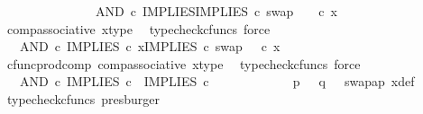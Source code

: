 \begin{isabellebody}
\ \ \ \ \ \ \ \ \ \ \ \ \ \ \ AND\ {\isasymcirc}\isactrlsub c\ {\isasymlangle}IMPLIES{\isacharcomma}{\kern0pt}IMPLIES\ {\isasymcirc}\isactrlsub c\ swap\ {\isasymOmega}\ {\isasymOmega}{\isasymrangle}\ \ {\isasymcirc}\isactrlsub c\ x{\isachardoublequoteclose}\isanewline
\ \ \ \ \ \ \ \ \ \ \isamarkupfalse%
\ comp{\isacharunderscore}{\kern0pt}associative{}\ x{\isacharunderscore}{\kern0pt}type\ \isamarkupfalse%
\ {\isacharparenleft}{\kern0pt}typecheck{\isacharunderscore}{\kern0pt}cfuncs{\isacharcomma}{\kern0pt}\ force{\isacharparenright}{\kern0pt}\isanewline
\ \ \ \ \ \ \ \ \isamarkupfalse%
\ \isamarkupfalse%
\ {\isachardoublequoteopen}{\isachardot}{\kern0pt}{\isachardot}{\kern0pt}{\isachardot}{\kern0pt}\ {\isacharequal}{\kern0pt}\ AND\ {\isasymcirc}\isactrlsub c\ {\isasymlangle}IMPLIES\ {\isasymcirc}\isactrlsub c\ x{\isacharcomma}{\kern0pt}IMPLIES\ {\isasymcirc}\isactrlsub c\ swap\ {\isasymOmega}\ {\isasymOmega}\ {\isasymcirc}\isactrlsub c\ x{\isasymrangle}{\isachardoublequoteclose}\isanewline
\ \ \ \ \ \ \ \ \ \ \isamarkupfalse%
\ cfunc{\isacharunderscore}{\kern0pt}prod{\isacharunderscore}{\kern0pt}comp\ comp{\isacharunderscore}{\kern0pt}associative{}\ x{\isacharunderscore}{\kern0pt}type\ \isamarkupfalse%
\ {\isacharparenleft}{\kern0pt}typecheck{\isacharunderscore}{\kern0pt}cfuncs{\isacharcomma}{\kern0pt}\ force{\isacharparenright}{\kern0pt}\isanewline
\ \ \ \ \ \ \ \ \isamarkupfalse%
\ \isamarkupfalse%
\ {\isachardoublequoteopen}{\isachardot}{\kern0pt}{\isachardot}{\kern0pt}{\isachardot}{\kern0pt}\ {\isacharequal}{\kern0pt}\ AND\ {\isasymcirc}\isactrlsub c\ {\isasymlangle}IMPLIES\ {\isasymcirc}\isactrlsub c\ {\isasymlangle}{\isasymf}{\isacharcomma}{\kern0pt}{\isasymt}{\isasymrangle}{\isacharcomma}{\kern0pt}\ IMPLIES\ {\isasymcirc}\isactrlsub c\ {\isasymlangle}{\isasymt}{\isacharcomma}{\kern0pt}{\isasymf}{\isasymrangle}{\isasymrangle}{\isachardoublequoteclose}\isanewline
\ \ \ \ \ \ \ \ \ \ \isamarkupfalse%
\ {\isacartoucheopen}p\ {\isacharequal}{\kern0pt}\ {\isasymf}{\isacartoucheclose}\ {\isacartoucheopen}q\ {\isacharequal}{\kern0pt}\ {\isasymt}{\isacartoucheclose}\ swap{\isacharunderscore}{\kern0pt}ap\ x{\isacharunderscore}{\kern0pt}def\ \isamarkupfalse%
\ {\isacharparenleft}{\kern0pt}typecheck{\isacharunderscore}{\kern0pt}cfuncs{\isacharcomma}{\kern0pt}\ presburger{\isacharparenright}{\kern0pt}\isanewline
\ \ \ \ \ \ \ \ \isamarkupfalse%
\ \isamarkupfalse%

\end{isabellebody}
